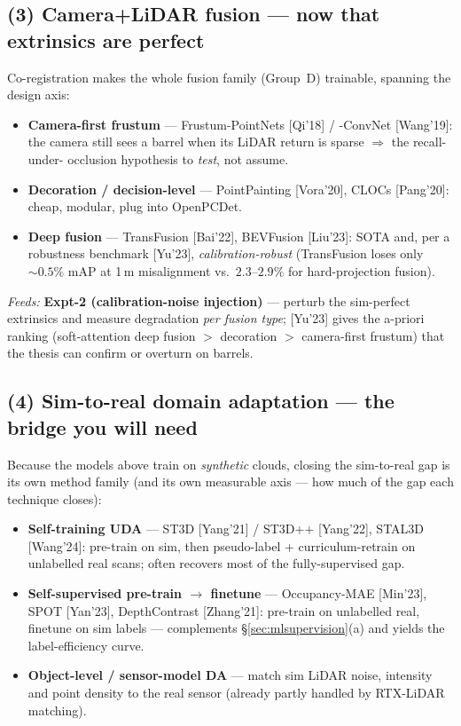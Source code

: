 \documentclass[10pt,a4paper]{article}
\begin{document}
\subsection{(3) Camera+LiDAR fusion --- now that extrinsics are perfect}
Co-registration makes the whole fusion family (Group~D) trainable, spanning the design axis:
\begin{itemize}[leftmargin=1.4em,itemsep=2pt,topsep=2pt]
  \item \textbf{Camera-first frustum} --- Frustum-PointNets [Qi'18] / -ConvNet [Wang'19]: the
  camera still sees a barrel when its LiDAR return is sparse $\Rightarrow$ the recall-under-
  occlusion hypothesis to \emph{test}, not assume.
  \item \textbf{Decoration / decision-level} --- PointPainting [Vora'20], CLOCs [Pang'20]:
  cheap, modular, plug into OpenPCDet.
  \item \textbf{Deep fusion} --- TransFusion [Bai'22], BEVFusion [Liu'23]: SOTA and, per a
  robustness benchmark [Yu'23], \emph{calibration-robust} (TransFusion loses only
  ${\sim}0.5\%$ mAP at 1\,m misalignment vs.\ $2.3$--$2.9\%$ for hard-projection fusion).
\end{itemize}
\emph{Feeds:} \textbf{Expt-2 (calibration-noise injection)} --- perturb the sim-perfect
extrinsics and measure degradation \emph{per fusion type}; [Yu'23] gives the a-priori ranking
(soft-attention deep fusion $>$ decoration $>$ camera-first frustum) that the thesis can
confirm or overturn on barrels.

\subsection{(4) Sim-to-real domain adaptation --- the bridge you will need}
Because the models above train on \emph{synthetic} clouds, closing the sim-to-real gap is its
own method family (and its own measurable axis --- how much of the gap each technique closes):
\begin{itemize}[leftmargin=1.4em,itemsep=2pt,topsep=2pt]
  \item \textbf{Self-training UDA} --- ST3D [Yang'21] / ST3D++ [Yang'22], STAL3D [Wang'24]:
  pre-train on sim, then pseudo-label + curriculum-retrain on unlabelled real scans; often
  recovers most of the fully-supervised gap.
  \item \textbf{Self-supervised pre-train $\to$ finetune} --- Occupancy-MAE [Min'23], SPOT
  [Yan'23], DepthContrast [Zhang'21]: pre-train on unlabelled real, finetune on sim labels ---
  complements \S\ref{sec:mlsupervision}(a) and yields the label-efficiency curve.
  \item \textbf{Object-level / sensor-model DA} --- match sim LiDAR noise, intensity and
  point density to the real sensor (already partly handled by RTX-LiDAR matching).
\end{itemize}
\end{document}

